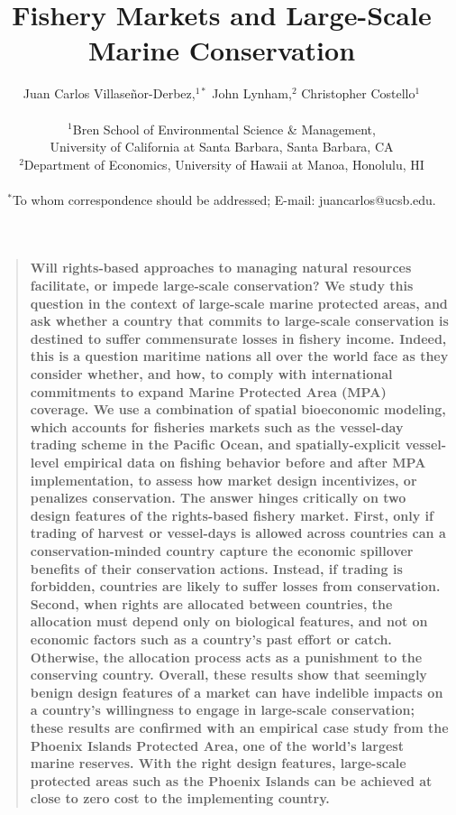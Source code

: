 \documentclass[12pt]{article}
\title{Fishery Markets and Large-Scale Marine Conservation}
\author{Juan Carlos Villase\~{n}or-Derbez,$^{1\ast}$ John Lynham,$^{2}$ Christopher Costello$^{1}$\\
\\
\normalsize{$^{1}$Bren School of Environmental Science \& Management,}\\
\normalsize{University of California at Santa Barbara, Santa Barbara, CA}\\
\normalsize{$^{2}$Department of Economics, University of Hawaii at Manoa, Honolulu, HI}\\
\\
\normalsize{$^\ast$To whom correspondence should be addressed; E-mail: juancarlos@ucsb.edu.}
}
\date{}
\newenvironment{sciabstract}{%
\begin{quote} \bf}
{\end{quote}}
\begin{document}

\baselineskip24pt


\maketitle



\begin{sciabstract}
Will rights-based approaches to managing natural resources facilitate, or impede large-scale conservation? We study this question in the context of large-scale marine protected areas, and ask whether a country that commits to large-scale conservation is destined to suffer commensurate losses in fishery income.  Indeed, this is a question maritime nations all over the world face as they consider whether, and how, to comply with international commitments to expand Marine Protected Area (MPA) coverage. We use a combination of spatial bioeconomic modeling, which accounts for fisheries markets such as the vessel-day trading scheme in the Pacific Ocean, and spatially-explicit vessel-level empirical data on fishing behavior before and after MPA implementation, to assess how market design incentivizes, or penalizes conservation. The answer hinges critically on two design features of the rights-based fishery market. First, only if trading of harvest or vessel-days is allowed across countries can a conservation-minded country capture the economic spillover benefits of their conservation actions.  Instead, if trading is forbidden, countries are likely to suffer losses from conservation. Second, when rights are allocated between countries, the allocation must depend only on biological features, and not on economic factors such as a country's past effort or catch. Otherwise, the allocation process acts as a punishment to the conserving country. Overall, these results show that seemingly benign design features of a market can have indelible impacts on a country's willingness to engage in large-scale conservation; these results are confirmed with an empirical case study from the Phoenix Islands Protected Area, one of the world's largest marine reserves. With the right design features, large-scale protected areas such as the Phoenix Islands can be achieved at close to zero cost to the implementing country.
\end{sciabstract}

\end{document}
